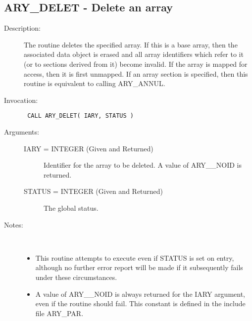 \documentclass[twoside,11pt]{article}
\newcommand{\xlabel}[1]{}
\newlength{\sstbannerlength}
\newlength{\sstcaptionlength}
\newlength{\sstexampleslength}
\newlength{\sstexampleswidth}
\newcommand{\sstroutine}[3]{
   \goodbreak
   \rule{\textwidth}{0.5mm}
   \vspace{-7ex}
   \newline
   \settowidth{\sstbannerlength}{{\Large {\bf #1}}}
   \setlength{\sstcaptionlength}{\textwidth}
   \setlength{\sstexampleslength}{\textwidth}
   \addtolength{\sstbannerlength}{0.5em}
   \addtolength{\sstcaptionlength}{-2.0\sstbannerlength}
   \addtolength{\sstcaptionlength}{-5.0pt}
   \settowidth{\sstexampleswidth}{{\bf Examples:}}
   \addtolength{\sstexampleslength}{-\sstexampleswidth}
   \parbox[t]{\sstbannerlength}{\flushleft{\Large {\bf #1}}}
   \parbox[t]{\sstcaptionlength}{\center{\Large #2}}
   \parbox[t]{\sstbannerlength}{\flushright{\Large {\bf #1}}}
   \begin{description}
      #3
   \end{description}
}
\newcommand{\sstdescription}[1]{\item[Description:] #1}
\newcommand{\sstinvocation}[1]{\item[Invocation:]\hspace{0.4em}{\tt #1}}
\newcommand{\sstarguments}[1]{
   \item[Arguments:] \mbox{} \\
   \vspace{-3.5ex}
   \begin{description}
      #1
   \end{description}
}
\newcommand{\sstsubsection}[1]{ \item[{#1}] \mbox{} \\}
\newcommand{\sstnotes}[1]{\item[Notes:] \mbox{} \\[1.3ex] #1}
\newcommand{\sstitemlist}[1]{
  \mbox{} \\
  \vspace{-3.5ex}
  \begin{itemize}
     #1
  \end{itemize}
}
\newcommand{\sstitem}{\item}
\newcommand{\ssttt}{\tt}
\renewcommand{\sstroutine}[3]{
      \subsection{#1\xlabel{#1}-\label{#1}#2}
      \begin{description}
         #3
      \end{description}
   }
\renewcommand{\sstdescription}[1]{\item[Description:]
      \begin{description}
         #1
      \end{description}
   }
\renewcommand{\sstinvocation}[1]{\item[Invocation:]
      \begin{description}
         {\ssttt #1}
      \end{description}
   }
\renewcommand{\sstarguments}[1]{
      \item[Arguments:]
      \begin{description}
         #1
      \end{description}
   }
\renewcommand{\sstsubsection}[1]{\item[{#1}]}
\renewcommand{\sstnotes}[1]{\item[Notes:]
      \begin{description}
         #1
      \end{description}
   }
\newcommand{\sstitemlist}[1]{
      \begin{itemize}
         #1
      \end{itemize}
   }
\begin{document}
\sstroutine{
   ARY\_DELET
}{
   Delete an array
}{
   \sstdescription{
      The routine deletes the specified array. If this is a base array,
      then the associated data object is erased and all array
      identifiers which refer to it (or to sections derived from it)
      become invalid. If the array is mapped for access, then it is
      first unmapped.  If an array section is specified, then this
      routine is equivalent to calling ARY\_ANNUL.
   }
   \sstinvocation{
      CALL ARY\_DELET( IARY, STATUS )
   }
   \sstarguments{
      \sstsubsection{
         IARY = INTEGER (Given and Returned)
      }{
         Identifier for the array to be deleted. A value of ARY\_\_NOID
         is returned.
      }
      \sstsubsection{
         STATUS = INTEGER (Given and Returned)
      }{
         The global status.
      }
   }
   \sstnotes{
      \sstitemlist{

         \sstitem
         This routine attempts to execute even if STATUS is set on
         entry, although no further error report will be made if it
         subsequently fails under these circumstances.

         \sstitem
         A value of ARY\_\_NOID is always returned for the IARY argument,
         even if the routine should fail. This constant is defined in the
         include file ARY\_PAR.
      }
   }
}
\end{document}
